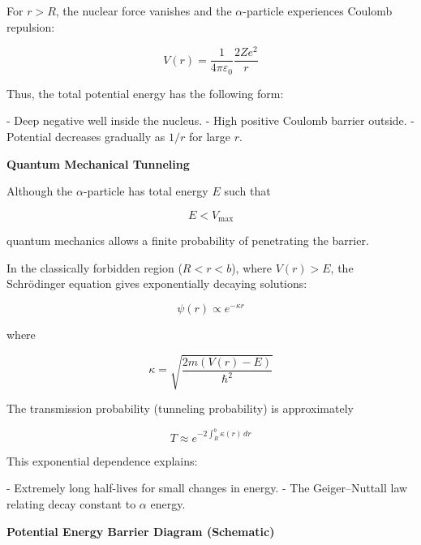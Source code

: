 \documentclass[a4paper, 12pt]{article}
\begin{document}
For $r>R$, the nuclear force vanishes and the $\alpha$-particle experiences Coulomb repulsion:

\[
V(r) = \frac{1}{4\pi\varepsilon_0}\frac{2Ze^2}{r}
\]

Thus, the total potential energy has the following form:

- Deep negative well inside the nucleus.
- High positive Coulomb barrier outside.
- Potential decreases gradually as $1/r$ for large $r$.

\vspace{0.4cm}

\textbf{Quantum Mechanical Tunneling}

Although the $\alpha$-particle has total energy $E$ such that

\[
E < V_{\text{max}}
\]

quantum mechanics allows a finite probability of penetrating the barrier.

In the classically forbidden region ($R < r < b$), where $V(r) > E$, the Schrödinger equation gives exponentially decaying solutions:

\[
\psi(r) \propto e^{-\kappa r}
\]

where

\[
\kappa = \sqrt{\frac{2m(V(r)-E)}{\hbar^2}}
\]

The transmission probability (tunneling probability) is approximately

\[
T \approx e^{-2 \int_R^b \kappa(r)\, dr}
\]

This exponential dependence explains:

- Extremely long half-lives for small changes in energy.
- The Geiger–Nuttall law relating decay constant to $\alpha$ energy.

\vspace{0.4cm}

\textbf{Potential Energy Barrier Diagram (Schematic)}

\begin{center}
\end{center}
\end{document}

